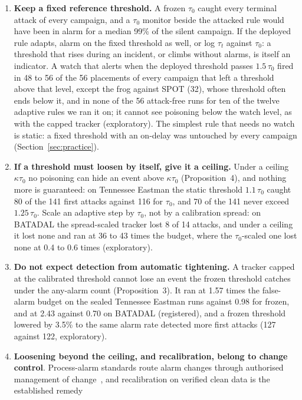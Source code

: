 \documentclass[sigconf]{acmart}
\begin{document}
\begin{enumerate}
\item \textbf{Keep a fixed reference threshold.} A frozen $\tau_0$ caught every terminal attack of
  every campaign, and a $\tau_0$ monitor beside the attacked rule would have been in alarm for a median
  99\% of the silent campaign. If the deployed rule adapts, alarm on the fixed threshold as well, or log
  $\tau_t$ against $\tau_0$: a threshold that rises during an incident, or climbs without alarms, is
  itself an indicator. A watch that alerts when the deployed threshold passes $1.5\,\tau_0$ fired in 48
  to 56 of the 56 placements of every campaign that left a threshold above that level, except the frog
  against SPOT (32), whose threshold often ends below it, and in none of the 56 attack-free runs
  for ten of the twelve adaptive rules we ran it on; it cannot see poisoning below the watch level,
  as with the capped tracker (exploratory). The simplest rule that needs no watch is static: a fixed
  threshold with an on-delay was untouched by every campaign (Section~\ref{sec:practice}).
\item \textbf{If a threshold must loosen by itself, give it a ceiling.} Under a ceiling
  $\kappa\tau_0$ no poisoning can hide an event above $\kappa\tau_0$ (Proposition~4), and nothing more
  is guaranteed: on Tennessee Eastman the static threshold $1.1\,\tau_0$ caught 80 of the 141 first
  attacks against 116 for $\tau_0$, and 70 of the 141 never exceed $1.25\,\tau_0$. Scale an adaptive
  step by $\tau_0$, not by a calibration spread: on BATADAL the spread-scaled tracker lost 8 of 14
  attacks, and under a ceiling it lost none and ran at 36 to 43 times the budget, where the
  $\tau_0$-scaled one lost none at 0.4 to 0.6 times (exploratory).
\item \textbf{Do not expect detection from automatic tightening.} A tracker capped at the calibrated
  threshold cannot lose an event the frozen threshold catches under the any-alarm count
  (Proposition~3). It ran at 1.57 times the false-alarm budget on the sealed Tennessee Eastman runs
  against 0.98 for frozen, and at 2.43 against 0.70 on BATADAL (registered), and a frozen threshold
  lowered by 3.5\% to the same alarm rate detected more first attacks (127 against 122, exploratory).
\item \textbf{Loosening beyond the ceiling, and recalibration, belong to change control}. Process-alarm standards route alarm changes through authorised management of
  change~\cite{isa182, eemua191}, and recalibration on verified clean data is the established remedy

\end{enumerate}
\end{document}
